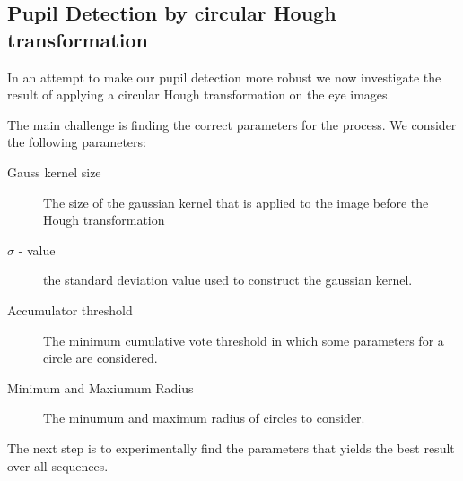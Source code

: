 \documentclass[a4paper,11pt]{article}
\begin{document}
\subsection{Pupil Detection by circular Hough transformation}

In an attempt to make our pupil detection more robust we now investigate the result of applying a
circular Hough transformation on the eye images.

The main challenge is finding the correct parameters for the process. We consider the following parameters:

\begin{description}
  \item[Gauss kernel size] The size of the gaussian kernel that is applied to the image before the Hough transformation

  \item[$\sigma$ - value] the standard deviation value used to construct the gaussian kernel.

  \item[Accumulator threshold] The minimum cumulative vote threshold in which some parameters for a circle are considered.

  \item[Minimum and Maxiumum Radius] The minumum and maximum radius of circles to consider.

\end{description}

The next step is to experimentally find the parameters that yields the best result over all sequences.
\end{document}
